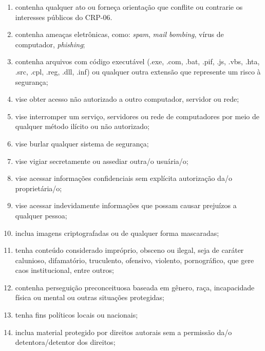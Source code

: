 \documentclass[openright, twoside, a4paper]{memoir}
\begin{document}
\begin{enumerate}
\def\labelenumi{\alph{enumi}.}
\item
    contenha qualquer ato ou forneça orientação que conflite ou contrarie
    os interesses públicos do CRP-06.
\item
    contenha ameaças eletrônicas, como: \emph{spam}, \emph{mail bombing},
    vírus de computador, \emph{phishing};
\item
    contenha arquivos com código executável (.exe, .com, .bat, .pif, .js,
    .vbs, .hta, .src, .cpl, .reg, .dll, .inf) ou qualquer outra extensão
    que represente um risco à segurança;
\item
    vise obter acesso não autorizado a outro computador, servidor ou rede;
\item
    vise interromper um serviço, servidores ou rede de computadores por
    meio de qualquer método ilícito ou não autorizado;
\item
    vise burlar qualquer sistema de segurança;
\item
    vise vigiar secretamente ou assediar outra/o usuária/o;
\item
    vise acessar informações confidenciais sem explícita autorização da/o
    proprietária/o;
\item
    vise acessar indevidamente informações que possam causar prejuízos a
    qualquer pessoa;
\item
    inclua imagens criptografadas ou de qualquer forma mascaradas;
\item
    tenha conteúdo considerado impróprio, obsceno ou ilegal, seja de
    caráter calunioso, difamatório, truculento, ofensivo, violento,
    pornográfico, que gere caos institucional, entre outros;
\item
    contenha perseguição preconceituosa baseada em gênero, raça,
    incapacidade física ou mental ou outras situações protegidas;
\item
    tenha fins políticos locais ou nacionais;
\item
    inclua material protegido por direitos autorais sem a permissão da/o
    detentora/detentor dos direitos;


\end{enumerate}
\end{document}
